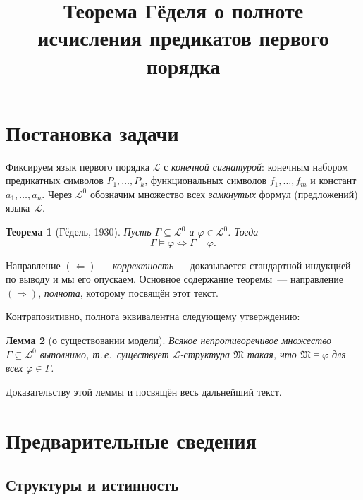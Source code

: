 \documentclass[12pt, a4paper]{article}
\theoremstyle{plain}
\newtheorem{theorem}{Теорема}
\newtheorem{lemma}[theorem]{Лемма}
\theoremstyle{definition}
\newcommand{\proves}{\vdash}
\renewcommand{\models}{\vDash}
\newcommand{\Lang}{\mathcal{L}}
\newcommand{\Struct}{\mathfrak{M}}
\begin{document}
\title{\textbf{Теорема Гёделя о полноте\\
исчисления предикатов первого порядка}}
\author{}
\date{}
\maketitle
\tableofcontents
\bigskip

\section{Постановка задачи}

Фиксируем язык первого порядка $\Lang$ с \emph{конечной сигнатурой}:
конечным набором предикатных символов $P_1,\ldots,P_k$,
функциональных символов $f_1,\ldots,f_m$ и констант $a_1,\ldots,a_n$.
Через $\Lang^0$ обозначим множество всех \emph{замкнутых} формул (предложений) языка~$\Lang$.

\begin{theorem}[Гёдель, 1930]\label{thm:completeness}
Пусть $\Gamma \subseteq \Lang^0$ и $\varphi \in \Lang^0$. Тогда
\[
  \Gamma \models \varphi \iff \Gamma \proves \varphi.
\]
\end{theorem}

Направление $(\Leftarrow)$ — \emph{корректность} — доказывается стандартной индукцией
по выводу и мы его опускаем. Основное содержание теоремы~--- направление
$(\Rightarrow)$, \emph{полнота}, которому посвящён этот текст.

Контрапозитивно, полнота эквивалентна следующему утверждению:

\begin{lemma}[о существовании модели]\label{lem:model-existence}
Всякое непротиворечивое множество $\Gamma \subseteq \Lang^0$ выполнимо,
т.\,е.\ существует $\Lang$-структура $\Struct$ такая, что $\Struct \models \varphi$
для всех $\varphi \in \Gamma$.
\end{lemma}

Доказательству этой леммы и посвящён весь дальнейший текст.

\section{Предварительные сведения}

\subsection{Структуры и истинность}
\end{document}
